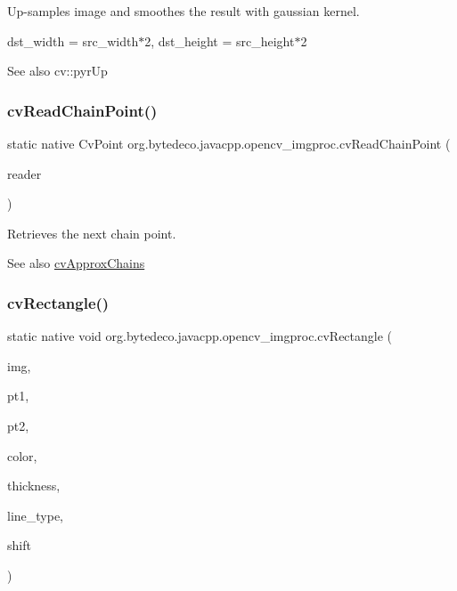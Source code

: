 Up-\/samples image and smoothes the result with gaussian kernel. 

dst\+\_\+width = src\+\_\+width$\ast$2, dst\+\_\+height = src\+\_\+height$\ast$2 \begin{DoxySeeAlso}{See also}
cv\+::pyr\+Up 
\end{DoxySeeAlso}
\mbox{\label{group__imgproc__c_ga60ca24d0d962737958150406351d91c7}} 
\subsubsection{\texorpdfstring{cv\+Read\+Chain\+Point()}{cvReadChainPoint()}}
{\footnotesize\ttfamily static native Cv\+Point org.\+bytedeco.\+javacpp.\+opencv\+\_\+imgproc.\+cv\+Read\+Chain\+Point (\begin{DoxyParamCaption}\item[{Cv\+Chain\+Pt\+Reader}]{reader }\end{DoxyParamCaption})\hspace{0.3cm}{\ttfamily [static]}}



Retrieves the next chain point. 

\begin{DoxySeeAlso}{See also}
\hyperlink{group__imgproc__c_ga5c874856009b84fc0c3a9533f957516c}{cv\+Approx\+Chains} 
\end{DoxySeeAlso}
\mbox{\label{group__imgproc__c_gabbde03cf95490cf3931d4949242e7d23}} 
\subsubsection{\texorpdfstring{cv\+Rectangle()}{cvRectangle()}}
{\footnotesize\ttfamily static native void org.\+bytedeco.\+javacpp.\+opencv\+\_\+imgproc.\+cv\+Rectangle (\begin{DoxyParamCaption}\item[{Cv\+Arr}]{img,  }\item[{@By\+Val Cv\+Point}]{pt1,  }\item[{@By\+Val Cv\+Point}]{pt2,  }\item[{@By\+Val Cv\+Scalar}]{color,  }\item[{int}]{thickness,  }\item[{int}]{line\+\_\+type,  }\item[{int}]{shift }\end{DoxyParamCaption})\hspace{0.3cm}{\ttfamily [static]}}



